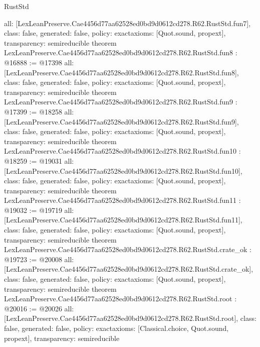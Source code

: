 \begin{lexlean}{RustStd}
\begin{coremodule}
{  all: [LexLeanPreserve.Cae4456d77aa62528ed0bd9d0612cd278.R62.RustStd.fun7],
  class: false,
  generated: false,
  policy: exact{axioms: [Quot.sound, propext]},
  transparency: semireducible
}
theorem LexLeanPreserve.Cae4456d77aa62528ed0bd9d0612cd278.R62.RustStd.fun8 : @16888 := @17398 {
  all: [LexLeanPreserve.Cae4456d77aa62528ed0bd9d0612cd278.R62.RustStd.fun8],
  class: false,
  generated: false,
  policy: exact{axioms: [Quot.sound, propext]},
  transparency: semireducible
}
theorem LexLeanPreserve.Cae4456d77aa62528ed0bd9d0612cd278.R62.RustStd.fun9 : @17399 := @18258 {
  all: [LexLeanPreserve.Cae4456d77aa62528ed0bd9d0612cd278.R62.RustStd.fun9],
  class: false,
  generated: false,
  policy: exact{axioms: [Quot.sound, propext]},
  transparency: semireducible
}
theorem LexLeanPreserve.Cae4456d77aa62528ed0bd9d0612cd278.R62.RustStd.fun10 : @18259 := @19031 {
  all: [LexLeanPreserve.Cae4456d77aa62528ed0bd9d0612cd278.R62.RustStd.fun10],
  class: false,
  generated: false,
  policy: exact{axioms: [Quot.sound, propext]},
  transparency: semireducible
}
theorem LexLeanPreserve.Cae4456d77aa62528ed0bd9d0612cd278.R62.RustStd.fun11 : @19032 := @19719 {
  all: [LexLeanPreserve.Cae4456d77aa62528ed0bd9d0612cd278.R62.RustStd.fun11],
  class: false,
  generated: false,
  policy: exact{axioms: [Quot.sound, propext]},
  transparency: semireducible
}
theorem LexLeanPreserve.Cae4456d77aa62528ed0bd9d0612cd278.R62.RustStd.crate_ok : @19723 := @20008 {
  all: [LexLeanPreserve.Cae4456d77aa62528ed0bd9d0612cd278.R62.RustStd.crate_ok],
  class: false,
  generated: false,
  policy: exact{axioms: [Quot.sound, propext]},
  transparency: semireducible
}
theorem LexLeanPreserve.Cae4456d77aa62528ed0bd9d0612cd278.R62.RustStd.root : @20016 := @20026 {
  all: [LexLeanPreserve.Cae4456d77aa62528ed0bd9d0612cd278.R62.RustStd.root],
  class: false,
  generated: false,
  policy: exact{axioms: [Classical.choice, Quot.sound, propext]},
  transparency: semireducible
}


\end{coremodule}
\end{lexlean}
